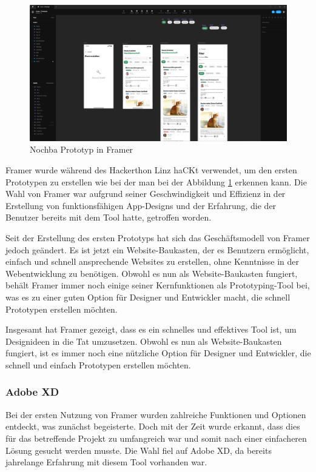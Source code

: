 \begin{figure}[h]
  \centering
  \includegraphics[width=1\textwidth]{pics/nochba-framer-prototype-screenshot.png}
  \caption{Nochba Prototyp in Framer}
  \label{fig:framer-prototype}
\end{figure}


Framer wurde während des Hackerthon Linz haCKt verwendet, um
den ersten Prototypen zu erstellen wie bei der man bei der
Abbildung \ref{fig:framer-prototype} erkennen kann. Die Wahl von Framer war
aufgrund seiner Geschwindigkeit und Effizienz in der
Erstellung von funktionsfähigen App-Designs und der
Erfahrung, die der Benutzer bereits mit dem Tool hatte,
getroffen worden.

Seit der Erstellung des ersten Prototyps hat sich das Geschäftsmodell von Framer jedoch geändert. Es ist jetzt ein Website-Baukasten, der es Benutzern ermöglicht, einfach und schnell ansprechende Websites zu erstellen, ohne Kenntnisse in der Webentwicklung zu benötigen. Obwohl es nun als Website-Baukasten fungiert, behält Framer immer noch einige seiner Kernfunktionen als Prototyping-Tool bei, was es zu einer guten Option für Designer und Entwickler macht, die schnell Prototypen erstellen möchten.

Insgesamt hat Framer gezeigt, dass es ein schnelles und effektives Tool ist, um Designideen in die Tat umzusetzen. Obwohl es nun als Website-Baukasten fungiert, ist es immer noch eine nützliche Option für Designer und Entwickler, die schnell und einfach Prototypen erstellen möchten.

\subsubsection{Adobe XD}
Bei der ersten Nutzung von Framer wurden zahlreiche Funktionen und Optionen entdeckt, was zunächst begeisterte. Doch mit der Zeit wurde erkannt, dass dies für das betreffende Projekt zu umfangreich war und somit nach einer einfacheren Lösung gesucht werden musste. Die Wahl fiel auf Adobe XD, da bereits jahrelange Erfahrung mit diesem Tool vorhanden war.

